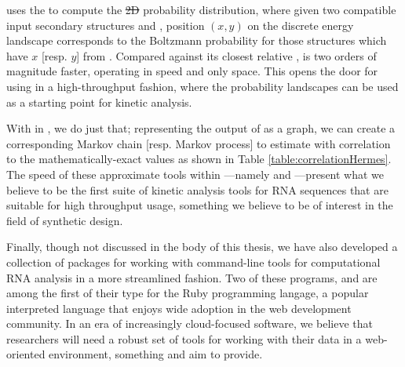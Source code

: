 \documentclass[11pt, oneside]{Thesis} %
\providecommand{\DIFdel}[1]{{\protect\color{red}\sout{#1}}}                      %
\providecommand{\DIFaddbegin}{} %
\providecommand{\DIFaddend}{} %
\providecommand{\DIFdelbegin}{} %
\providecommand{\DIFdelend}{} %
\begin{document}
 uses the \fft to compute the \DIFdelbegin \DIFdel{2D }\DIFdelend \DIFaddbegin \twoD \DIFaddend probability distribution, where
given two compatible input secondary structures \strA and \strB, position
$(x,y)$ on the discrete energy landscape corresponds to the Boltzmann
probability for those structures \str which have \bpd $x$ [resp. $y$]
from . Compared against its closest relative \rnatwofold,
\ffttwo is two orders of magnitude faster, operating in  speed and only
 space. This opens the door for using \ffttwo in a high-throughput fashion,
where the probability landscapes can be used as a starting point for kinetic
analysis.

With \hermes in , we do just that; representing the output of
\ffttwo as a graph, we can create a corresponding Markov chain [resp. Markov
process] to estimate  with correlation to the
mathematically-exact values as shown in Table \ref{table:correlationHermes}.
The speed of these approximate tools within \hermes---namely \fftmfpt and
\ffteq---present what we believe to be the first suite of kinetic analysis
tools for RNA sequences that are suitable for high throughput usage, something
we believe to be of interest in the field of synthetic design.

Finally, though not discussed in the body of this thesis, we have also
developed a collection of packages for working with command-line tools for
computational RNA analysis in a more streamlined fashion. Two of these programs,
\href{https://github.com/evansenter/wrnap}{\wrnap} and
\href{https://github.com/evansenter/rbfam}{\rbfam} are among the first of their
type for the Ruby programming langage, a popular interpreted language that
enjoys wide adoption in the web development community. In an era of increasingly
cloud-focused software, we believe that researchers will need a robust set of
tools for working with their data in a web-oriented environment, something
\wrnap and \rbfam aim to provide.


\DIFdelbegin %

\DIFdelend %

\appendix %
\end{document}
